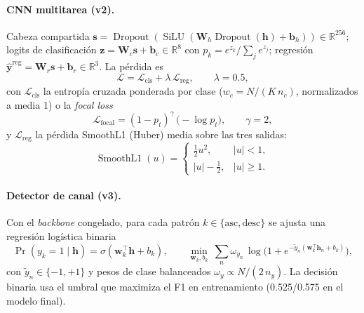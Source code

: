 \documentclass[11pt,a4paper]{article}
\begin{document}
\paragraph{CNN multitarea (v2).} Cabeza compartida
$\mathbf{s}=\operatorname{Dropout}(\operatorname{SiLU}(\mathbf{W}_h
\operatorname{Dropout}(\mathbf{h})+\mathbf{b}_h))\in\mathbb{R}^{256}$; logits de
clasificación $\mathbf{z}=\mathbf{W}_c\mathbf{s}+\mathbf{b}_c\in\mathbb{R}^{8}$
con $p_k = e^{z_k}/\sum_j e^{z_j}$; regresión
$\widehat{\mathbf{y}}^{\mathrm{reg}} = \mathbf{W}_r\mathbf{s}+\mathbf{b}_r \in
\mathbb{R}^3$. La pérdida es
\begin{equation}
\mathcal{L} = \mathcal{L}_{\mathrm{cls}} + \lambda\,\mathcal{L}_{\mathrm{reg}},
\qquad \lambda = 0.5,
\end{equation}
con $\mathcal{L}_{\mathrm{cls}}$ la entropía cruzada ponderada por clase
($w_c = N/(K\,n_c)$, normalizados a media 1) o la \emph{focal loss}
\cite{lin2017focal}
\begin{equation}
\mathcal{L}_{\mathrm{focal}} = (1-p_t)^{\gamma}\,\bigl(-\log p_t\bigr),
\qquad \gamma = 2,
\end{equation}
y $\mathcal{L}_{\mathrm{reg}}$ la pérdida SmoothL1 (Huber) media sobre las tres
salidas:
\begin{equation}
\operatorname{SmoothL1}(u)=
\begin{cases}
\tfrac{1}{2}u^2, & |u|<1,\\
|u|-\tfrac{1}{2}, & |u|\ge 1.
\end{cases}
\end{equation}

\paragraph{Detector de canal (v3).} Con el \emph{backbone} congelado, para cada
patrón $k\in\{\text{asc},\text{desc}\}$ se ajusta una regresión logística
binaria
\begin{equation}
\Pr(y_k=1\mid\mathbf{h}) = \sigma(\mathbf{w}_k^{\top}\mathbf{h} + b_k),
\qquad
\min_{\mathbf{w}_k,b_k}\ \sum_{n} \omega_{y_n}\,
\log\bigl(1+e^{-\tilde y_n(\mathbf{w}_k^{\top}\mathbf{h}_n+b_k)}\bigr),
\end{equation}
con $\tilde y_n \in \{-1,+1\}$ y pesos de clase balanceados
$\omega_{y}\propto N/(2\,n_{y})$. La decisión binaria usa el umbral que maximiza
el F1 en entrenamiento (0.525/0.575 en el modelo final).
\end{document}
